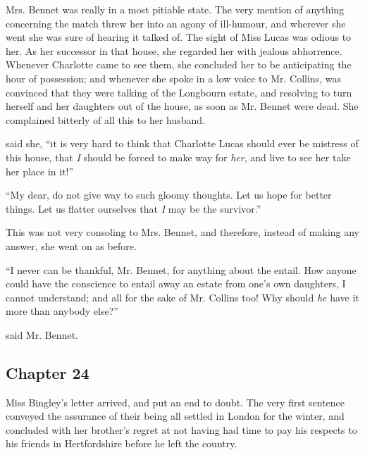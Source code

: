 Mrs. Bennet was really in a most pitiable state. The very mention of anything concerning the match threw her into an agony of ill-humour, and wherever she went she was sure of hearing it talked of. The sight of Miss Lucas was odious to her. As her successor in that house, she regarded her with jealous abhorrence. Whenever Charlotte came to see them, she concluded her to be anticipating the hour of possession; and whenever she spoke in a low voice to Mr. Collins, was convinced that they were talking of the Longbourn estate, and resolving to turn herself and her daughters out of the house, as soon as Mr. Bennet were dead. She complained bitterly of all this to her husband.

 said she, “it is very hard to think that Charlotte Lucas should ever be mistress of this house, that {\em I} should be forced to make way for {\em her}, and live to see her take her place in it!”

“My dear, do not give way to such gloomy thoughts. Let us hope for better things. Let us flatter ourselves that {\em I} may be the survivor.”

This was not very consoling to Mrs. Bennet, and therefore, instead of making any answer, she went on as before.





“I never can be thankful, Mr. Bennet, for anything about the entail. How anyone could have the conscience to entail away an estate from one's own daughters, I cannot understand; and all for the sake of Mr. Collins too! Why should {\em he} have it more than anybody else?”

 said Mr. Bennet.

\subsection[chapter-24]{\useURL[url24][][][]\from[url24] Chapter 24}

Miss Bingley's letter arrived, and put an end to doubt. The very first sentence conveyed the assurance of their being all settled in London for the winter, and concluded with her brother's regret at not having had time to pay his respects to his friends in Hertfordshire before he left the country.

